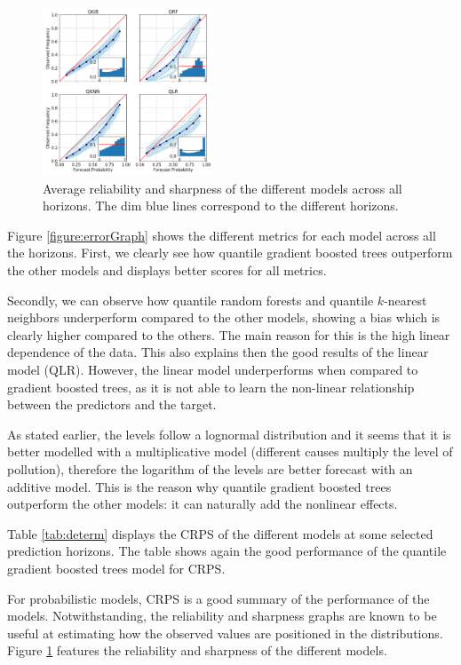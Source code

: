 \documentclass[a4paper,3p,sort&compress]{elsarticle}
\begin{document}
\begin{figure}
  \centering
  \includegraphics[width=0.45\textwidth]{reliability_sharpness}
  \caption{\label{figure:rel_sharp}Average reliability and sharpness
    of the different models across all horizons. The dim blue lines
    correspond to the different horizons. }
\end{figure}

Figure \ref{figure:errorGraph} shows the different metrics for each
model across all the horizons. First, we clearly see how 
quantile gradient
boosted trees outperform the other models and displays better scores
for all metrics.

Secondly, we can observe how quantile random forests and 
quantile $k$-nearest
neighbors underperform compared to the other models, showing a bias
which is clearly higher compared to the others.  The main reason for
this is the high linear dependence of the data. This also explains
then the good results of the linear model (QLR).  However, the linear
model underperforms when compared to gradient boosted trees, as it is
not able to learn the non-linear relationship between the predictors
and the target.

As stated earlier, the \no levels follow a lognormal
distribution and it seems that it is better modelled with a
multiplicative model (different causes multiply the level of
pollution), therefore the logarithm of the \no levels
are better forecast with an additive model. 
This is the reason why
quantile gradient boosted trees outperform 
the other models: it can naturally
add the nonlinear effects.

Table \ref{tab:determ} displays the CRPS of the different models at
some selected prediction horizons. The table shows again the good
performance of the quantile 
gradient boosted trees model for CRPS.

For probabilistic models, CRPS is a good summary of the performance of
the models. Notwithstanding, the reliability and sharpness graphs are
known to be useful at estimating how the observed values are
positioned in the distributions.  Figure \ref{figure:rel_sharp}
features the reliability and sharpness of the different models.
\end{document}
